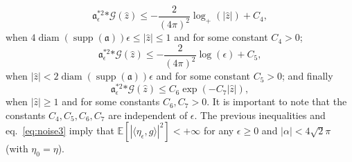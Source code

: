\documentclass[a4paper,10pt]{article}
\newcommand{\asterisk}{\mathord{*}}
\newcommand{\tmop}[1]{\ensuremath{\operatorname{#1}}}
\begin{document}
\begin{equation}
  \mathfrak{a}_{\epsilon}^{\asterisk 2} \asterisk \mathcal{G} (\hat{z})
  \leqslant - \frac{2}{(4 \pi)^2} \log_+ (| \hat{z} |) + C_4,
  \label{eq:probabilistic3}
\end{equation}
when $4 \tmop{diam} (\tmop{supp} (\mathfrak{a})) \epsilon \leqslant | \hat{z}
| \leqslant 1$ and for some constant $C_4 > 0$; \
\begin{equation}
  \mathfrak{a}_{\epsilon}^{\asterisk 2} \asterisk \mathcal{G} (\hat{z})
  \leqslant - \frac{2}{(4 \pi)^2} \log (\epsilon) + C_5,
  \label{eq:probabilistic4}
\end{equation}
when $| \hat{z} | < 2 \tmop{diam} (\tmop{supp} (\mathfrak{a})) \epsilon$ and
for some constant $C_5 > 0$; and finally
\begin{equation}
  \mathfrak{a}_{\epsilon}^{\asterisk 2} \asterisk \mathcal{G} (\hat{z})
  \leqslant C_6 \exp (- C_7 | \hat{z} |) \label{eq:probabilistic5},
\end{equation}
when $| \hat{z} | \geqslant 1$ and for some constants $C_6, C_7 > 0$. It is
important to note that the constants $C_4, C_5, C_6, C_7$ are independent of
$\epsilon$. The previous inequalities and eq.~{\eqref{eq:noise3}} imply that
$\mathbb{E} [| \langle \eta_{\epsilon}, g \rangle |^2] < + \infty$ for any
$\epsilon \geqslant 0$ and $| \alpha | < 4 \sqrt{2} \pi$ (with $\eta_0 =
\eta$).
\end{document}
